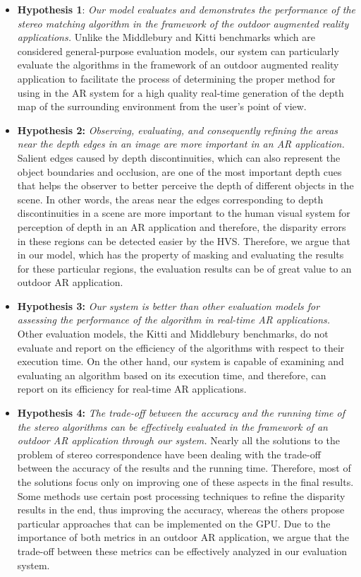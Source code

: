 \begin{itemize}
\item \textbf{Hypothesis 1}: \emph{Our model evaluates and demonstrates 
the performance of the stereo matching algorithm in the framework of 
the outdoor augmented reality applications.} 
Unlike the Middlebury and Kitti benchmarks which are considered general-purpose evaluation models, 
our system can particularly evaluate the algorithms in the framework of an 
outdoor augmented reality application to facilitate the process of determining
the proper method for using in the AR system for a high quality real-time generation of the depth map of the surrounding environment from 
the user's point of view.

\item \textbf{Hypothesis 2:} \emph{Observing, evaluating, and consequently 
refining the areas near the depth edges in an image are more important in an AR application.}
Salient edges caused by depth discontinuities, 
which can also represent the object boundaries and occlusion, are one of the 
most important depth cues that helps the observer to better perceive the depth of different objects in the scene. In other words, the areas near the edges corresponding to depth discontinuities
in a scene are more important to the human visual system for perception of depth in an AR application and therefore, the disparity 
errors in these regions can be detected easier by the HVS. Therefore, we argue that in our model, which has the property of masking and evaluating the results for
these particular regions,
the evaluation results can be of great value to an outdoor AR application.

\item \textbf{Hypothesis 3:} \emph{Our system is better than other evaluation models for assessing the performance of the algorithm in
real-time AR applications.}
Other evaluation models, the Kitti and Middlebury benchmarks, do not evaluate and report on the efficiency of the algorithms
with respect to their execution time. On the other hand, our system is capable of examining and evaluating an algorithm 
based on its execution time, and therefore, can report on its efficiency for real-time AR applications.

\item \textbf{Hypothesis 4:} \emph{The trade-off between the accuracy and the running time of the stereo algorithms can be effectively evaluated 
in the framework of an outdoor AR application through our system.} 
Nearly all the solutions to the problem of stereo correspondence have been dealing with the trade-off between the accuracy of the results and the running time.
Therefore, most of the solutions focus only on improving one of these aspects in the final results. Some methods use certain post processing techniques to refine the 
disparity results in the end, thus improving the accuracy, whereas the others propose particular approaches that can be implemented on the GPU.
Due to the importance of both metrics in an outdoor AR application, we argue that the trade-off between these metrics can be effectively analyzed in our evaluation system.


\end{itemize}

